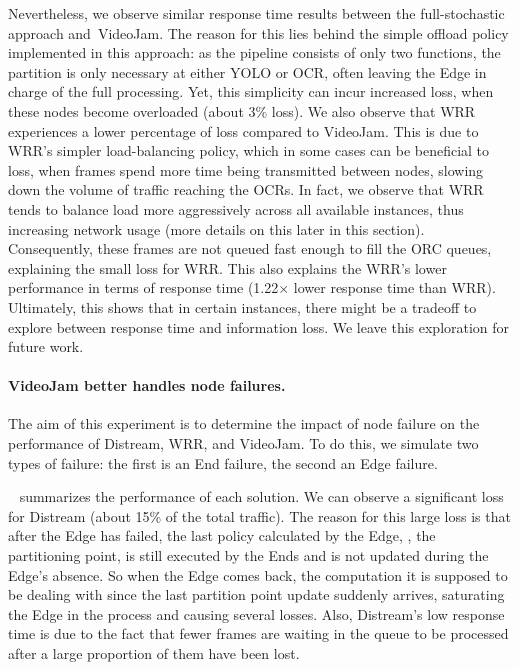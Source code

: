 Nevertheless, we observe similar response time results between the full-stochastic approach and~VideoJam. The reason for this lies behind the simple offload policy implemented in this approach: as the pipeline consists of only two functions, the partition is only necessary at either YOLO or OCR, often leaving the Edge in charge of the full processing. Yet, this simplicity can incur increased loss, when these nodes become overloaded (about 3\% loss). We also observe that WRR experiences a lower percentage of loss compared to VideoJam. This is due to WRR's simpler load-balancing policy, which in some cases can be beneficial to loss, when frames spend more time being transmitted between nodes, slowing down the volume of traffic reaching the OCRs. In fact, we observe that WRR tends to balance load more aggressively across all available instances, thus increasing network usage (more details on this later in this section). Consequently, these frames are not queued fast enough to fill the ORC queues, explaining the small loss for WRR. This also explains the WRR's lower performance in terms of response time (1.22$\times$ lower response time than WRR). Ultimately, this shows that in certain instances, there might be a tradeoff to explore between response time and information loss. We leave this exploration for future work.



\paragraph{VideoJam better handles node failures.} The aim of this experiment is to determine the impact of node failure on the performance of Distream, WRR, and VideoJam. To do this, we simulate two types of failure: the first is an End failure, the second an Edge failure.

~ summarizes the performance of each solution. We can observe a significant loss for Distream (about 15\% of the total traffic). The reason for this large loss is that after the Edge has failed, the last policy calculated by the Edge, \ie, the partitioning point, is still executed by the Ends and is not updated during the Edge's absence. So when the Edge comes back, the computation it is supposed to be dealing with since the last partition point update suddenly arrives, saturating the Edge in the process and causing several losses. Also, Distream's low response time is due to the fact that fewer frames are waiting in the queue to be processed after a large proportion of them have been lost.

